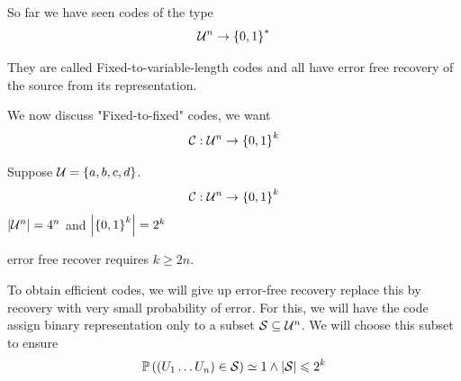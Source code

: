 So far we have seen codes of the type
\[
    \mathcal{U}^n \to \left\{ 0,1 \right\}^*
\]

They are called Fixed-to-variable-length codes and all have error free recovery of the source from its representation.

We now discuss "Fixed-to-fixed" codes, we want
\[
    \mathcal{C}: \mathcal{U}^n \to \left\{ 0,1 \right\}^k
\]

\begin{example}
    Suppose $\mathcal{U}=\left\{ a,b,c,d \right\}$.
    \[
        \mathcal{C}: \mathcal{U}^n \to \left\{ 0,1 \right\}^k
    \]
    $\left\lvert\mathcal{U}^n\right\rvert = 4^n$ and 
    $\left\lvert\left\{ 0,1 \right\}^k\right\rvert = 2^k$
    
    error free recover requires $k\geqslant 2n$.
\end{example}

To obtain efficient codes, we will give up error-free recovery replace this by recovery with very small probability of error. For this, we will have the code assign binary representation only to a subset $\mathcal{S} \subseteq \mathcal{U}^n$. We will choose this subset to ensure 
\[
    \mathbb{P}\left( (U_1\ldots U_n)\in\mathcal{S} \right) \simeq 1 \wedge \left\lvert\mathcal{S}\right\rvert \leqslant 2^k
\]

